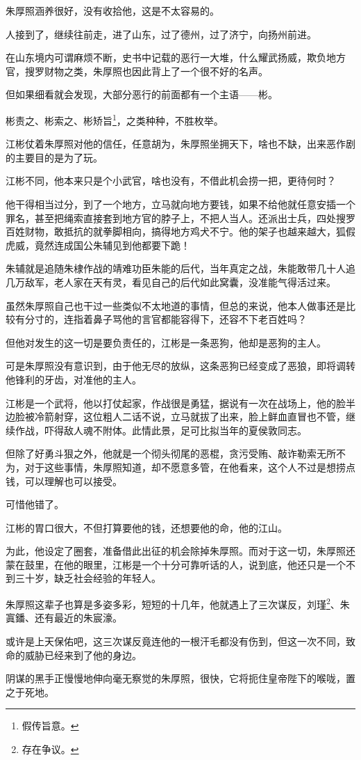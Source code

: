 \begin{multicols}{\theparacolNo}
		朱厚照涵养很好，没有收拾他，这是不太容易的。

		人接到了，继续往前走，进了山东，过了德州，过了济宁，向扬州前进。

		在山东境内可谓麻烦不断，史书中记载的恶行一大堆，什么耀武扬威，欺负地方官，搜罗财物之类，朱厚照也因此背上了一个很不好的名声。

		但如果细看就会发现，大部分恶行的前面都有一个主语——彬。

		彬责之、彬索之、彬矫旨\footnote{假传旨意。}，之类种种，不胜枚举。

		江彬仗着朱厚照对他的信任，任意胡为，朱厚照坐拥天下，啥也不缺，出来恶作剧的主要目的是为了玩。

		江彬不同，他本来只是个小武官，啥也没有，不借此机会捞一把，更待何时？

		他干得相当过分，到了一个地方，立马就向地方要钱，如果不给他就任意安插一个罪名，甚至把绳索直接套到地方官的脖子上，不把人当人。还派出士兵，四处搜罗百姓财物，敢抵抗的就拳脚相向，搞得地方鸡犬不宁。他的架子也越来越大，狐假虎威，竟然连成国公朱辅见到他都要下跪！

		朱辅就是追随朱棣作战的靖难功臣朱能的后代，当年真定之战，朱能敢带几十人追几万敌军，老人家在天有灵，看见自己的后代如此窝囊，没准能气得活过来。

		虽然朱厚照自己也干过一些类似不太地道的事情，但总的来说，他本人做事还是比较有分寸的，连指着鼻子骂他的言官都能容得下，还容不下老百姓吗？

		但他对发生的这一切是要负责任的，江彬是一条恶狗，他却是恶狗的主人。

		可是朱厚照没有意识到，由于他无尽的放纵，这条恶狗已经变成了恶狼，即将调转他锋利的牙齿，对准他的主人。

		江彬是一个武将，他以打仗起家，作战很是勇猛，据说有一次在战场上，他的脸半边脸被冷箭射穿，这位粗人二话不说，立马就拔了出来，脸上鲜血直冒也不管，继续作战，吓得敌人魂不附体。此情此景，足可比拟当年的夏侯敦同志。

		但除了好勇斗狠之外，他就是一个彻头彻尾的恶棍，贪污受贿、敲诈勒索无所不为，对于这些事情，朱厚照知道，却不愿意多管，在他看来，这个人不过是想捞点钱，可以理解也可以接受。

		可惜他错了。

		江彬的胃口很大，不但打算要他的钱，还想要他的命，他的江山。

		为此，他设定了圈套，准备借此出征的机会除掉朱厚照。而对于这一切，朱厚照还蒙在鼓里，在他的眼里，江彬是一个十分可靠听话的人，说到底，他还只是一个不到三十岁，缺乏社会经验的年轻人。

		朱厚照这辈子也算是多姿多彩，短短的十几年，他就遇上了三次谋反，刘瑾\footnote{存在争议。}、朱寘鐇、还有最近的朱宸濠。

		或许是上天保佑吧，这三次谋反竟连他的一根汗毛都没有伤到，但这一次不同，致命的威胁已经来到了他的身边。

		阴谋的黑手正慢慢地伸向毫无察觉的朱厚照，很快，它将扼住皇帝陛下的喉咙，置之于死地。
		\ifnum{}
	\end{multicols}
\fi
\newpage
